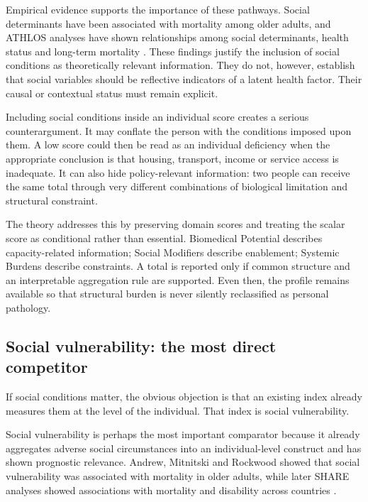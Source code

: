 Empirical evidence supports the importance of these pathways. Social determinants have been associated with mortality among older adults, and ATHLOS analyses have shown relationships among social determinants, health status and long-term mortality \citep{social_determinants_mortality_2014,athlos_social_determinants_2018}. These findings justify the inclusion of social conditions as theoretically relevant information. They do not, however, establish that social variables should be reflective indicators of a latent health factor. Their causal or contextual status must remain explicit.

Including social conditions inside an individual score creates a serious
counterargument. It may conflate the person with the conditions imposed upon
them. A low score could then be read as an individual deficiency when the
appropriate conclusion is that housing, transport, income or service access is
inadequate. It can also hide policy-relevant information: two people can receive
the same total through very different combinations of biological limitation and
structural constraint.

The theory addresses this by preserving domain scores and treating the scalar
score as conditional rather than essential. Biomedical Potential describes
capacity-related information; Social Modifiers describe enablement; Systemic
Burdens describe constraints. A total is reported only if common structure and
an interpretable aggregation rule are supported. Even then, the profile remains
available so that structural burden is never silently reclassified as personal
pathology.

\subsection{Social vulnerability: the most direct competitor}

If social conditions matter, the obvious objection is that an existing index already measures them at the level of the individual. That index is social vulnerability.

Social vulnerability is perhaps the most important comparator because it already aggregates adverse social circumstances into an individual-level construct and has shown prognostic relevance. Andrew, Mitnitski and Rockwood showed that social vulnerability was associated with mortality in older adults, while later SHARE analyses showed associations with mortality and disability across countries \citep{andrew_social_vulnerability_2008,social_vulnerability_share_2014}.


